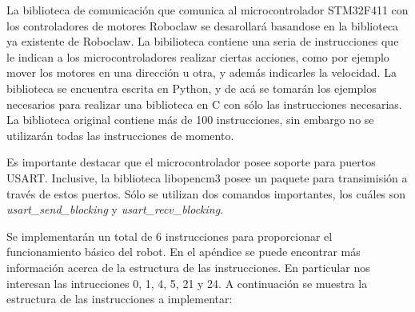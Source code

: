 La biblioteca de comunicación que comunica al microcontrolador STM32F411 con los controladores de motores Roboclaw se desarollará basandose en la biblioteca ya existente de Roboclaw. La bibilioteca contiene una seria de instrucciones que le indican a los microcontroladores realizar ciertas acciones, como por ejemplo mover los motores en una dirección u otra, y además indicarles la velocidad. La biblioteca se encuentra escrita en Python, y de acá se tomarán los ejemplos necesarios para realizar una biblioteca en C con sólo las instrucciones necesarias. La biblioteca original contiene más de 100 instrucciones, sin embargo no se utilizarán todas las instrucciones de momento.

Es importante destacar que el microcontrolador posee soporte para puertos USART. Inclusive, la biblioteca libopencm3 posee un paquete para transimisión a través de estos puertos. Sólo se utilizan dos comandos importantes, los cuáles son \textit{usart\_send\_blocking} y \textit{usart\_recv\_blocking}.

Se implementarán un total de 6 instrucciones para proporcionar el funcionamiento básico del robot. En el apéndice se puede encontrar más información acerca de la estructura de las instrucciones. En particular nos interesan las intrucciones 0, 1, 4, 5, 21 y 24. A continuación se muestra la estructura de las instrucciones a implementar:

